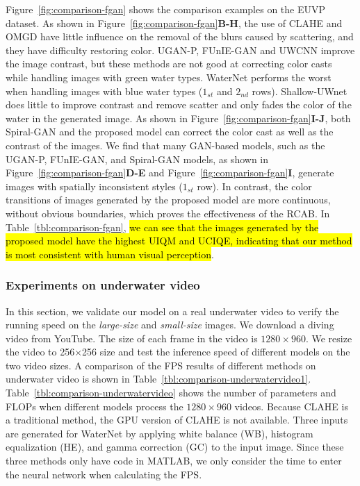 \documentclass[utf8]{FrontiersinHarvard} %
\begin{document}
Figure~\ref{fig:comparison-fgan} shows the comparison examples on the EUVP dataset. As shown in Figure~\ref{fig:comparison-fgan}\textbf{B-H}, the use of CLAHE and OMGD have little influence on the removal of the blurs caused by scattering, and they have difficulty restoring color. UGAN-P, FUnIE-GAN and UWCNN improve the image contrast, but these methods are not good at correcting color casts while handling images with green water types. WaterNet performs the worst when handling images with blue water types ($1_{st}$ and $2_{nd}$ rows). Shallow-UWnet does little to improve contrast and remove scatter and only fades the color of the water in the generated image. As shown in Figure~\ref{fig:comparison-fgan}\textbf{I-J}, both Spiral-GAN and the proposed model can correct the color cast as well as the contrast of the images. We find that many GAN-based models, such as the UGAN-P, FUnIE-GAN, and Spiral-GAN models, as shown in Figure~\ref{fig:comparison-fgan}\textbf{D-E} and Figure~\ref{fig:comparison-fgan}\textbf{I}, generate images with spatially inconsistent styles ($1_{st}$ row). In contrast, the color transitions of images generated by the proposed model are more continuous, without obvious boundaries, which proves the effectiveness of the RCAB. In Table~\ref{tbl:comparison-fgan}, \hl{we can see that the images generated by the proposed model have the highest UIQM and UCIQE, indicating that our method is most consistent with human visual perception}.

\subsubsection{Experiments on underwater video}
In this section, we validate our model on a real underwater video to verify the running speed on the \textit{large-size} and \textit{small-size} images. We download a diving video from YouTube. The size of each frame in the video is $1280\times960$. We resize the video to 256$\times$256 size and test the inference speed of different models on the two video sizes. A comparison of the FPS results of different methods on underwater video is shown in Table~\ref{tbl:comparison-underwatervideo1}. Table~\ref{tbl:comparison-underwatervideo} shows the number of parameters and FLOPs when different models process the $1280\times960$ videos. Because CLAHE is a traditional method, the GPU version of CLAHE is not available. Three inputs are generated for WaterNet by applying white balance (WB), histogram equalization (HE), and gamma correction (GC) to the input image. Since these three methods only have code in MATLAB, we only consider the time to enter the neural network when calculating the FPS.
\end{document}
